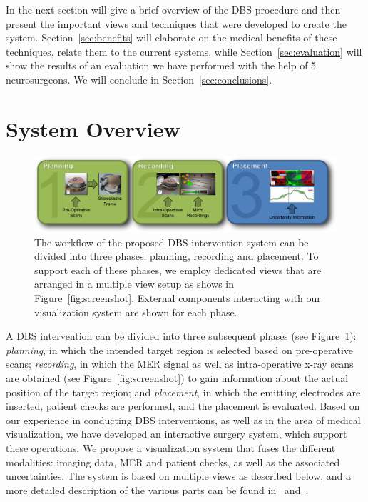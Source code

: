 \documentclass{egpubl}
\begin{document}
In the next section will give a brief overview of the DBS procedure and then present the important views and techniques that were developed to create the system. Section~\ref{sec:benefits} will elaborate on the medical benefits of these techniques, relate them to the current systems, while Section~\ref{sec:evaluation} will show the results of an evaluation we have performed with the help of 5 neurosurgeons. We will conclude in Section~\ref{sec:conclusions}.


\section{System Overview}\label{sec:setup}
\begin{figure}[t]
    \centering
    \includegraphics[width=0.9\linewidth]{figures/workflow}
    \caption{The workflow of the proposed DBS intervention system can be divided into three phases: planning, recording and placement. To support each of these phases, we employ dedicated views that are arranged in a multiple view setup as shows in Figure~\ref{fig:screenshot}. External components interacting with our visualization system are shown for each phase.}
    \label{fig:workflow}
\end{figure}

A DBS intervention can be divided into three subsequent phases (see Figure~\ref{fig:workflow}): \emph{planning}, in which the intended target region is selected based on pre-operative scans; \emph{recording}, in which the MER signal as well as intra-operative x-ray scans are obtained (see Figure~\ref{fig:screenshot}) to gain information about the actual position of the target region; and \emph{placement}, in which the emitting electrodes are inserted, patient checks are performed, and the placement is evaluated. Based on our experience in conducting DBS interventions, as well as in the area of medical visualization, we have developed an interactive surgery system, which support these operations. We propose a visualization system that fuses the different modalities: imaging data, MER and patient checks, as well as the associated uncertainties. The system is based on multiple views as described below, and a more detailed description of the various parts can be found in~\cite{Bock12} and~\cite{Bock13}.
\end{document}
